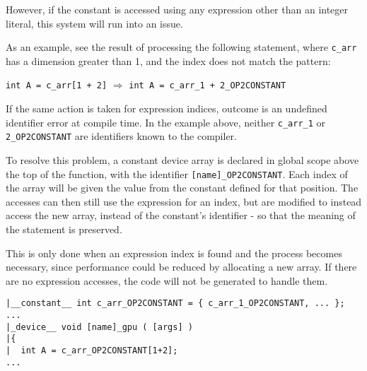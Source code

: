 However, if the constant is accessed using any expression other than an integer literal, this system will run into an issue.
\par As an example, see the result of processing the following statement, where \verb|c_arr| has a dimension greater than 1, and the index does not match the pattern:
\begin{center}
\lstinline|int A = c_arr[1 + 2]| \hspace{1cm}$\Rightarrow$\hspace{1cm} \lstinline |int A = c_arr_1 + 2_OP2CONSTANT|
\end{center}

If the same action is taken for expression indices, outcome is an undefined identifier error at compile time. In the example above, neither \verb|c_arr_1| or \verb|2_OP2CONSTANT| are identifiers known to the compiler.
\par
To resolve this problem, a constant device array is declared in global scope above the top of the function, with the identifier \verb|[name]_OP2CONSTANT|. Each index of the array will be given the value from the constant defined for that position. The accesses can then still use the expression for an index, but are modified to instead access the new array, instead of the constant's identifier - so that the meaning of the statement is preserved.
\par This is only done when an expression index is found and the process becomes necessary, since performance could be reduced by allocating a new array. If there are no expression accesses, the code will not be generated to handle them.\\
\begin{lstlisting}[backgroundcolor=\color{green!20}]
|__constant__ int c_arr_OP2CONSTANT = { c_arr_1_OP2CONSTANT, ... };
...
|_device__ void [name]_gpu ( [args] )
|{
|  int A = c_arr_OP2CONSTANT[1+2];
...
\end{lstlisting}


